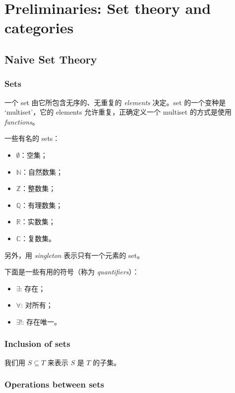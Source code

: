 \chapter{Preliminaries: Set theory and categories}
\section{Naive Set Theory}\label{1.1}

\subsection{Sets}\label{sec:1.1.1}

一个 set 由它所包含无序的、无重复的 \emph{elements} 决定。set 的一个变种是 `multiset'，它的 elements 允许重复，正确定义一个 multiset 的方式是使用 \emph{functions}。

一些有名的 sets：
\begin{itemize}
    \item \(\emptyset\)：空集；
    \item \(\mathbb{N}\)：自然数集；
    \item \(\mathbb{Z}\)：整数集；
    \item \(\mathbb{Q}\)：有理数集；
    \item \(\mathbb{R}\)：实数集；
    \item \(\mathbb{C}\)：复数集。
\end{itemize}

另外，用 \emph{singleton} 表示只有一个元素的 set。

下面是一些有用的符号（称为 \emph{quantifiers}）：

\begin{itemize}
    \item \(\exists\): 存在；
    \item \(\forall\): 对所有；
    \item \(\exists!\): 存在唯一。
\end{itemize}

\subsection{Inclusion of sets}\label{sec:1.1.2}

我们用 \(S \subseteq T\) 来表示 \(S\) 是 \(T\) 的子集。

\subsection{Operations between sets}\label{sec:1.1.3}

